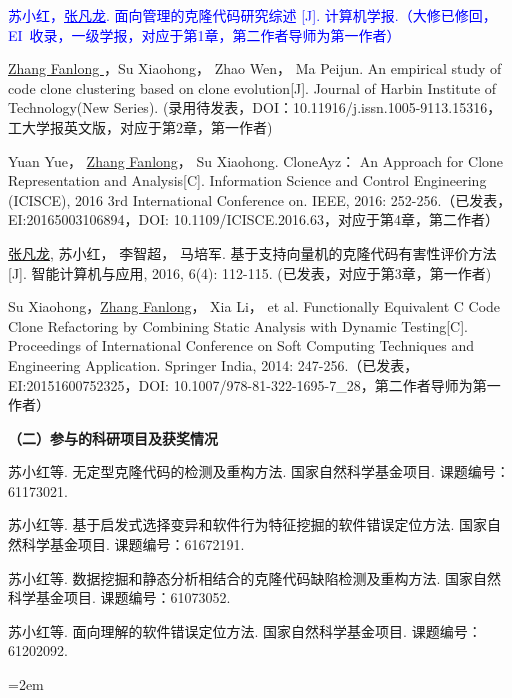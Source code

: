 \begin{publist}
\item 
\textcolor{blue}{苏小红，\underline{张凡龙}. 面向管理的克隆代码研究综述 [J]. 计算机学报.（大修已修回，EI~收录，一级学报，对应于第1章，第二作者导师为第一作者）}
\item
\underline{Zhang Fanlong }，Su Xiaohong， Zhao Wen， Ma Peijun. An empirical study of code clone clustering based on clone evolution[J]. Journal of Harbin Institute of Technology(New Series). (录用待发表，DOI：10.11916/j.issn.1005-9113.15316，工大学报英文版，对应于第2章，第一作者)

\item
Yuan Yue， \underline{Zhang Fanlong}， Su Xiaohong. CloneAyz： An Approach for Clone Representation and Analysis[C]. Information Science and Control Engineering (ICISCE), 2016 3rd International Conference on. IEEE, 2016: 252-256.（已发表，EI:20165003106894，DOI:	10.1109/ICISCE.2016.63，对应于第4章，第二作者）
\item
\underline{张凡龙}, 苏小红， 李智超， 马培军. 基于支持向量机的克隆代码有害性评价方法[J]. 智能计算机与应用, 2016, 6(4): 112-115. (已发表，对应于第3章，第一作者)

\item
Su Xiaohong，\underline{Zhang Fanlong}， Xia Li， et al. Functionally Equivalent C Code Clone Refactoring by Combining Static Analysis with Dynamic Testing[C]. Proceedings of International Conference on Soft Computing Techniques and Engineering Application. Springer India, 2014: 247-256.（已发表，EI:20151600752325，DOI: 10.1007/978-81-322-1695-7\_28，第二作者导师为第一作者）
\end{publist}




\noindent\textbf{（二）参与的科研项目及获奖情况}
\begin{publist}
\item	
苏小红等. 无定型克隆代码的检测及重构方法. 国家自然科学基金项目. 课题编号：61173021.
\item 
苏小红等. 基于启发式选择变异和软件行为特征挖掘的软件错误定位方法. 国家自然科学基金项目. 课题编号：61672191.
\item
苏小红等. 数据挖掘和静态分析相结合的克隆代码缺陷检测及重构方法. 国家自然科学基金项目. 课题编号：61073052.
\item
苏小红等. 面向理解的软件错误定位方法. 国家自然科学基金项目. 课题编号：61202092.

\end{publist}
\vfill
{}\hangindent=2em\noindent

\setlength{\parindent}{2em}
